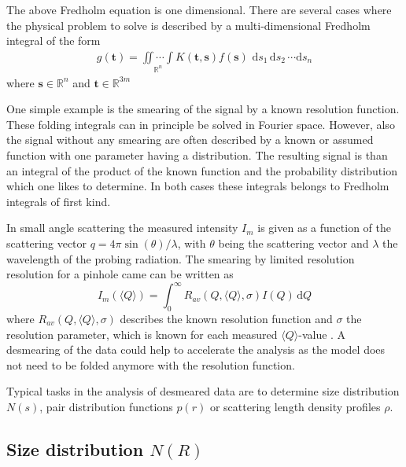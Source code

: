 The above Fredholm equation is one dimensional. There are several cases where the physical problem to solve is described by a multi-dimensional Fredholm integral of the form
\begin{align}
\label{eq:Fredholm}
g(\mathbf{t})=\underset{\mathds{R}^n}{\iint\cdots\int} K(\mathbf{t},\mathbf{s})f(\mathbf{s})\,\,\mathrm{d}s_1\,\mathrm{d}s_2\,\cdots \mathrm{d}s_n
\end{align}
where $\mathbf{s} \in \mathds{R}^n$ and $\mathbf{t} \in \mathds{R}^{3m}$

One simple example is the smearing of the signal by a known resolution function. These folding integrals can in principle be solved in Fourier space. However, also the signal without any smearing are often described by a known or assumed function with one parameter having a distribution. The resulting signal is than an integral of the product of the known function and the probability distribution which one likes to determine. In both cases these integrals belongs to Fredholm integrals of first kind.

In small angle scattering the measured intensity $I_m$ is given as a function of the scattering vector $q=4\pi\sin(\theta)/\lambda$, with $\theta$ being the scattering vector and $\lambda$ the wavelength of the probing radiation. The smearing by limited resolution resolution for a pinhole came can be written as
\begin{equation} \label{eq:res}
I_m(\langle Q\rangle) = \int_0^\infty R_{av}\left(Q,\langle
Q\rangle,\sigma\right) I(Q) \, \mathrm{d}Q
\end{equation}
where $R_{av}\left(Q,\langle Q\rangle,\sigma\right)$ describes the known resolution function and $\sigma$ the resolution parameter, which is known for each measured $\langle Q\rangle$-value \cite{Pedersen1990}. A desmearing of the data could help to accelerate the analysis as the model does not need to be folded anymore with the resolution function.

Typical tasks in the analysis of desmeared data are to determine size distribution $N(s)$, pair distribution functions $p(r)$ or scattering length density profiles $\rho$.

\subsection{Size distribution $N(R)$}~\\
\label{sec:N(R)}

